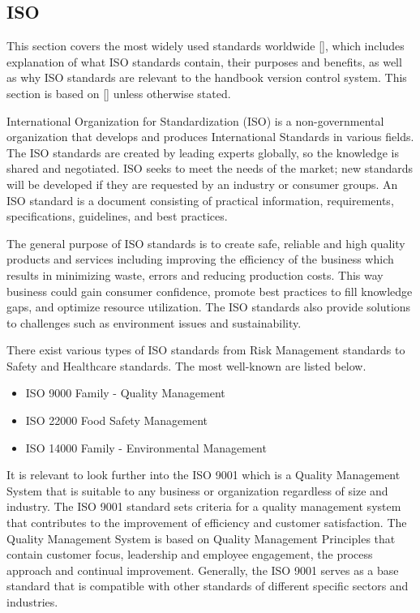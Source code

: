 \subsection{ISO}
This section covers the most widely used standards worldwide [], which includes explanation of what ISO standards contain, their purposes and benefits, as well as why ISO standards are relevant to the handbook version control system. This section is based on [] unless otherwise stated.

International Organization for Standardization (ISO) is a non-governmental organization that develops and produces International Standards in various fields. The ISO standards are created by leading experts globally, so the knowledge is shared and negotiated. ISO seeks to meet the needs of the market; new standards will be developed if they are requested by an industry or consumer groups. An ISO standard is a document consisting of practical information, requirements, specifications, guidelines, and best practices.

The general purpose of ISO standards is to create safe, reliable and high quality products and services including improving the efficiency of the business which results in minimizing waste, errors and reducing production costs. This way business could gain consumer confidence, promote best practices to fill knowledge gaps, and optimize resource utilization. The ISO standards also provide solutions to challenges such as environment issues and sustainability.

There exist various types of ISO standards from Risk Management standards to Safety and Healthcare standards. The most well-known are listed below.

\begin{itemize}
	\item ISO 9000 Family - Quality Management
	\item ISO 22000 Food Safety Management
	\item ISO 14000 Family - Environmental Management

\end{itemize}

It is relevant to look further into the ISO 9001 which is a Quality Management System that is suitable to any business or organization regardless of size and industry. The ISO 9001 standard sets criteria for a quality management system that contributes to the improvement of efficiency and customer satisfaction. The Quality Management System is based on Quality Management Principles that contain customer focus, leadership and employee engagement, the process approach and continual improvement. Generally, the ISO 9001 serves as a base standard that is compatible with other standards of different specific sectors and industries.


